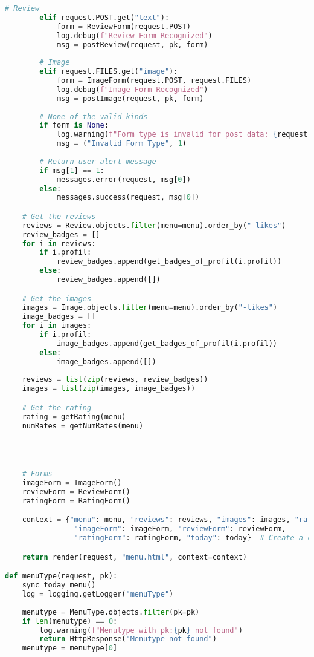 \begin{lstlisting}[language=Python]
        # Review
        elif request.POST.get("text"):
            form = ReviewForm(request.POST)
            log.debug(f"Review Form Recognized")
            msg = postReview(request, pk, form)
        
        # Image
        elif request.FILES.get("image"):
            form = ImageForm(request.POST, request.FILES)
            log.debug(f"Image Form Recognized")
            msg = postImage(request, pk, form)
        
        # None of the valid kinds
        if form is None:
            log.warning(f"Form type is invalid for post data: {request.POST}")
            msg = ("Invalid Form Type", 1)
        
        # Return user alert message
        if msg[1] == 1:
            messages.error(request, msg[0])
        else:
            messages.success(request, msg[0])

    # Get the reviews
    reviews = Review.objects.filter(menu=menu).order_by("-likes")
    review_badges = []
    for i in reviews:
        if i.profil:
            review_badges.append(get_badges_of_profil(i.profil))
        else:
            review_badges.append([])

    # Get the images
    images = Image.objects.filter(menu=menu).order_by("-likes")
    image_badges = []
    for i in images:
        if i.profil:
            image_badges.append(get_badges_of_profil(i.profil))
        else:
            image_badges.append([])
    
    reviews = list(zip(reviews, review_badges))
    images = list(zip(images, image_badges))

    # Get the rating
    rating = getRating(menu)
    numRates = getNumRates(menu)


    

    # Forms
    imageForm = ImageForm()
    reviewForm = ReviewForm()
    ratingForm = RatingForm()

    context = {"menu": menu, "reviews": reviews, "images": images, "rating": rating, "numRates": numRates,
                "imageForm": imageForm, "reviewForm": reviewForm,
                "ratingForm": ratingForm, "today": today}  # Create a context dictionary to pass to the template

    return render(request, "menu.html", context=context)

def menuType(request, pk):
    sync_today_menu()
    log = logging.getLogger("menuType")
    
    menutype = MenuType.objects.filter(pk=pk)
    if len(menutype) == 0:
        log.warning(f"Menutype with pk:{pk} not found")
        return HttpResponse("Menutype not found")
    menutype = menutype[0]


\end{lstlisting}
